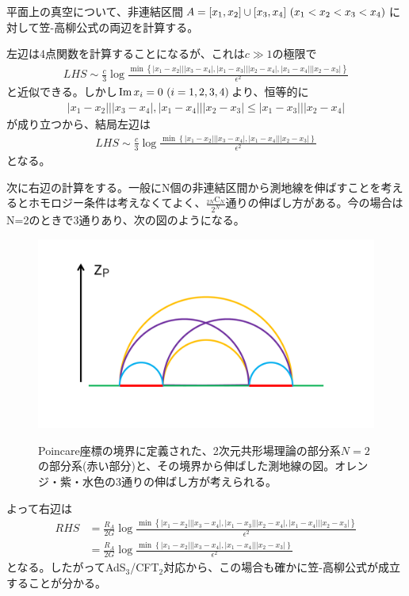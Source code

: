 平面上の真空について、非連結区間$A=[x_1,x_2]\union [x_3,x_4]\ (x_1<x_2<x_3<x_4)$に対して笠-高柳公式の両辺を計算する。

左辺は4点関数を計算することになるが、これは$c\gg 1$の極限で
\begin{align}
LHS\sim\frac{c}{3}\log \frac{\min \left\{ |x_1-x_2|||x_3-x_4|, |x_1-x_3|||x_2-x_4|, |x_1-x_4|||x_2-x_3| \right\}}{\epsilon^2}
\end{align}
と近似できる。しかし$\text{Im}\, x_i=0\ (i=1,2,3,4)$より、恒等的に
\begin{align}
|x_1-x_2|||x_3-x_4|,|x_1-x_4|||x_2-x_3| \le |x_1-x_3|||x_2-x_4|
\end{align}
が成り立つから、結局左辺は
\begin{align}
LHS\sim\frac{c}{3}\log \frac{\min \left\{ |x_1-x_2|||x_3-x_4|,  |x_1-x_4|||x_2-x_3| \right\}}{\epsilon^2}
\end{align}
となる。

次に右辺の計算をする。一般にN個の非連結区間から測地線を伸ばすことを考えるとホモロジー条件は考えなくてよく、$\frac{_{2N}\text{C}_N}{2^N}$通りの伸ばし方がある。今の場合はN=2のときで3通りあり、次の図のようになる。

\begin{figure}[h]
	\centering
	\includegraphics[width=0.7\linewidth]{disconnRTsurface.pdf}
	\label{fig:disconnRTsurface}
	\caption{Poincare座標の境界に定義された、2次元共形場理論の部分系$N=2$の部分系(赤い部分)と、その境界から伸ばした測地線の図。オレンジ・紫・水色の3通りの伸ばし方が考えられる。}
\end{figure}

よって右辺は
\begin{align}
RHS&=\frac{R_A}{2G}\log \frac{\min \left\{ |x_1-x_2|||x_3-x_4|, |x_1-x_3|||x_2-x_4|, |x_1-x_4|||x_2-x_3| \right\}}{\epsilon^2}\\
&=\frac{R_A}{2G}\log \frac{\min \left\{ |x_1-x_2|||x_3-x_4|, |x_1-x_4|||x_2-x_3| \right\}}{\epsilon^2}
\end{align}
となる。したがってAdS$_3$/CFT$_2$対応から、この場合も確かに笠-高柳公式が成立することが分かる。


